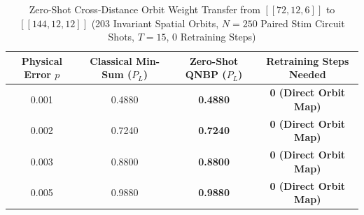 \begin{table}[t]
\caption{Zero-Shot Cross-Distance Orbit Weight Transfer from $[[72,12,6]]$ to $[[144,12,12]]$ (203 Invariant Spatial Orbits, $N=250$ Paired Stim Circuit Shots, $T=15$, 0 Retraining Steps)}
\label{tab:zero_shot_transfer}
\centering
\begin{tabular}{cccc}
\toprule
\textbf{Physical Error $p$} & \textbf{Classical Min-Sum ($P_L$)} & \textbf{Zero-Shot QNBP ($P_L$)} & \textbf{Retraining Steps Needed} \\
\midrule
0.001 & 0.4880 & \textbf{0.4880} & \textbf{0 (Direct Orbit Map)} \\
0.002 & 0.7240 & \textbf{0.7240} & \textbf{0 (Direct Orbit Map)} \\
0.003 & 0.8800 & \textbf{0.8800} & \textbf{0 (Direct Orbit Map)} \\
0.005 & 0.9880 & \textbf{0.9880} & \textbf{0 (Direct Orbit Map)} \\
\bottomrule
\end{tabular}
\end{table}
